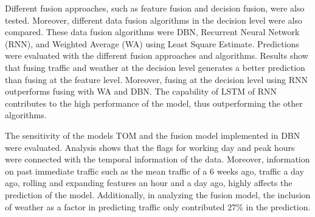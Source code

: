 Different fusion approaches, such as feature fusion and decision fusion, were also tested. Moreover, different data fusion algorithms in the decision level were also compared. These data fusion algorithms were DBN, Recurrent Neural Network (RNN), and Weighted Average (WA) using Least Square Estimate. Predictions were evaluated with the different fusion approaches and algorithms. Results show that fusing traffic and weather at the decision level generates a better prediction than fusing at the feature level. Moreover, fusing at the decision level using RNN outperforms fusing with WA and DBN. The capability of LSTM of RNN contributes to the high performance of the model, thus outperforming the other algorithms. 

The sensitivity of the models TOM and the fusion model implemented in DBN were evaluated. Analysis shows that the flags for working day and peak hours were connected with the temporal information of the data. Moreover, information on past immediate traffic such as the mean traffic of a 6 weeks ago, traffic a day ago, rolling and expanding features an hour and a day ago, highly affects the prediction of the model. Additionally, in analyzing the fusion model, the inclusion of weather as a factor in predicting traffic only contributed 27\% in the prediction. 

